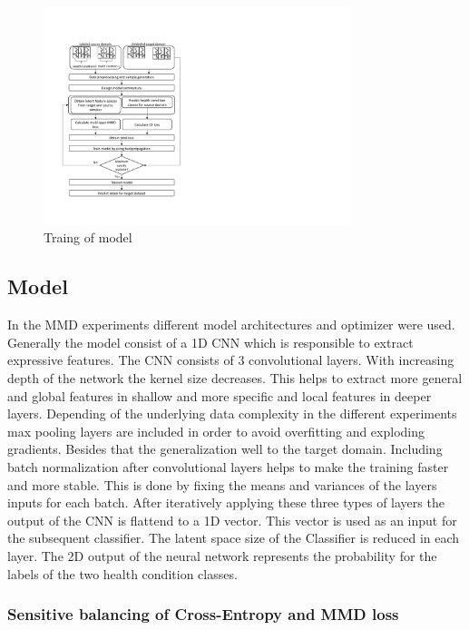 \begin{figure}[htpb]
  \centering
  \includegraphics[width=0.8\textwidth]{Training_process_mmd}
  \caption {Traing of model} \label{fig:Training_Process_MMD}
\end{figure}


\subsection{Model}
In the MMD experiments different model architectures and optimizer were used. Generally the model consist of a 1D CNN which is responsible to extract expressive features. The CNN consists of 3 convolutional layers. With increasing depth of the network the kernel size decreases. This helps to extract more general and global features in shallow and more specific and local features in deeper layers. Depending of the underlying data complexity in the different experiments max pooling layers are included in order to avoid overfitting and exploding gradients. Besides that the generalization  well to the target domain. Including batch normalization after convolutional layers helps to make the training faster and more stable. This is done by fixing the means and variances of the layers inputs for each batch. After iteratively applying these three types of layers the output of the CNN is flattend to a 1D vector. This vector is used as an input for the subsequent classifier. The latent space size of the Classifier is reduced in each layer. The 2D output of the neural network represents the probability for the labels of the two health condition classes.


\subsubsection{Sensitive balancing of Cross-Entropy and MMD loss} \label{sec:Balancing Cross-Entropy and MMD loss}

